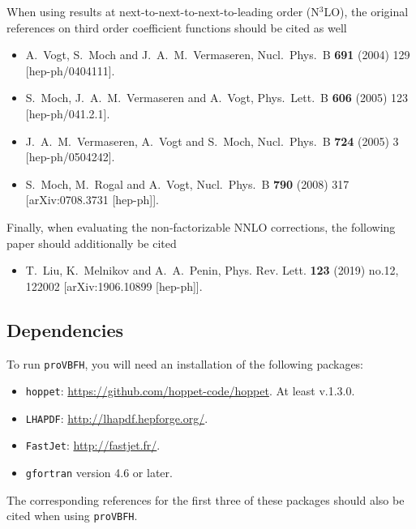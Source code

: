 \documentclass[12pt,a4]{article}
\newcommand{\provbfh}{\texttt{proVBFH}\xspace}
\begin{document}
When using results at next-to-next-to-next-to-leading order (N$^3$LO), the
original references on third order coefficient functions should be
cited as well
\begin{itemize}
\item A.~Vogt, S.~Moch and J.~A.~M.~Vermaseren,
  Nucl.\ Phys.\ B {\bf 691} (2004) 129
  [hep-ph/0404111].
\item S.~Moch, J.~A.~M.~Vermaseren and A.~Vogt,
  Phys.\ Lett.\ B {\bf 606} (2005) 123
  [hep-ph/041.2.1].
\item J.~A.~M.~Vermaseren, A.~Vogt and S.~Moch,
  Nucl.\ Phys.\ B {\bf 724} (2005) 3
  [hep-ph/0504242].
\item S.~Moch, M.~Rogal and A.~Vogt,
  Nucl.\ Phys.\ B {\bf 790} (2008) 317
  [arXiv:0708.3731 [hep-ph]].
\end{itemize}

Finally, when evaluating the non-factorizable NNLO corrections, the following
paper should additionally be cited
\begin{itemize}
\item T.~Liu, K.~Melnikov and A.~A.~Penin,
  Phys. Rev. Lett. \textbf{123} (2019) no.12, 122002
  [arXiv:1906.10899 [hep-ph]].
\end{itemize}
\subsection{Dependencies}
To run \provbfh, you will need an installation of the following packages:
\begin{itemize}
\item \texttt{hoppet}:
  \url{https://github.com/hoppet-code/hoppet}. At least v.1.3.0.
\item \texttt{LHAPDF}: \url{http://lhapdf.hepforge.org/}.
\item \texttt{FastJet}: \url{http://fastjet.fr/}.
\item \texttt{gfortran} version 4.6 or later.
\end{itemize}
%
The corresponding references for the first three of these packages
should also be cited when using \provbfh.
\end{document}
